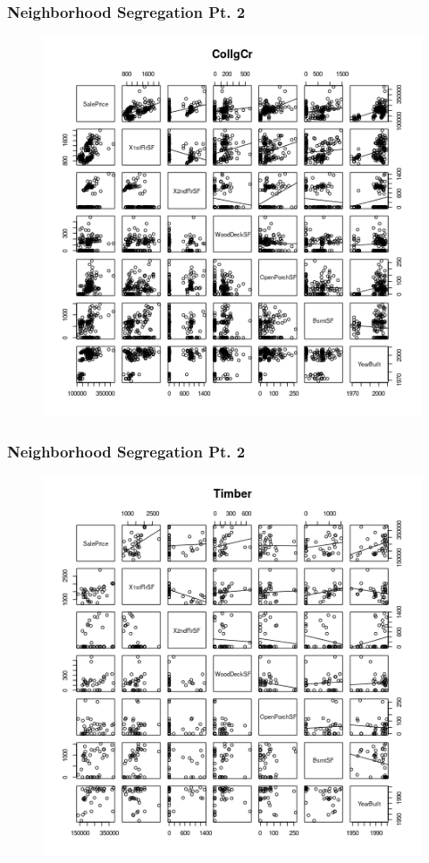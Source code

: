 \documentclass{beamer}
\begin{document}
\begin{frame}
\frametitle{Neighborhood Segregation Pt. 2}
\begin{figure}
\includegraphics[width=0.75\linewidth,keepaspectratio=true]{img/pairCollgCr.png}
\end{figure}
\end{frame}

\begin{frame}
\frametitle{Neighborhood Segregation Pt. 2}
\begin{figure}
\includegraphics[width=0.75\linewidth,keepaspectratio=true]{img/pairTimber.png}
\end{figure}
\end{frame}
\end{document}
